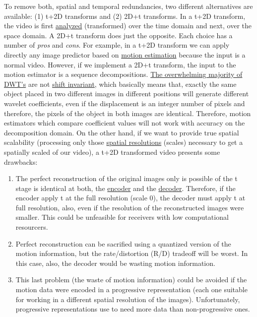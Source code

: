 To remove both, spatial and temporal redundancies, two different
alternatives are available: (1) t+2D transforms and (2) 2D+t
transforms. In a t+2D transform, the video is first
\href{https://en.wikipedia.org/wiki/Digital_filter\#Analysis_techniques}{analyzed}
(transformed) over the time domain and next, over the space domain. A
2D+t transform does just the opposite. Each choice has a number of
\emph{pros} and \emph{cons}. For example, in a t+2D transform we can
apply directly any image predictor based on
\href{https://en.wikipedia.org/wiki/Motion_estimation}{motion
  estimation} because the input is a normal video. However, if we
implement a 2D+t transform, the input to the motion estimator is a
sequence decompositions.
\href{http://www.polyvalens.com/blog/wavelets/theory}{The overwhelming
  majority of DWT's} are not
\href{http://www.polyvalens.com/blog/wavelets/theory}{shift
  invariant}, which basically means that, exactly the same object
placed in two different images in different positions will generate
different wavelet coefficients, even if the displacement is an integer
number of pixels and therefore, the pixels of the object in both
images are identical.  Therefore, motion estimators which compare
coefficient values will not work with accuracy on the decomposition
domain. On the other hand, if we want to provide true spatial
scalability (processing only those
\href{https://www.tutorialspoint.com/dip/spatial_resolution.htm}{spatial
  resolutions} (scales) necessary to get a spatially scaled of our
video), a t+2D transformed video presents some drawbacks:

\begin{enumerate}
\item The perfect reconstruction of the original images only is
  possible of the t stage is identical at both, the
  \href{https://en.wikipedia.org/wiki/Encoder}{encoder} and the
  \href{https://en.wikipedia.org/wiki/Decoder}{decoder}. Therefore, if
  the encoder apply t at the full resolution (scale 0), the decoder
  must apply t at full resolution, also, even if the resolution of the
  reconstructed images were smaller. This could be unfeasible for
  receivers with low computational resourcers.
\item Perfect reconstruction can be sacrified using a quantized
  version of the motion information, but the rate/distortion (R/D)
  tradeoff will be worst. In this case, also, the decoder would be
  wasting motion information.
\item This last problem (the waste of motion information) could be
  avoided if the motion data were encoded in a progressive
  representation (each one suitable for working in a different spatial
  resolution of the images). Unfortunately, progressive
  representations use to need more data than non-progressive ones.
\end{enumerate}

